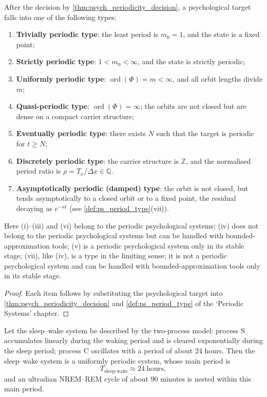 \begin{corollary}\label{cor:psych_period_type}
After the decision by \cref{thm:psych_periodicity_decision}, a psychological target falls into one of the following types:
\begin{enumerate}[label=(\roman*)]
    \item \textbf{Trivially periodic type}: the least period is $m_0=1$, and the state is a fixed point;
    \item \textbf{Strictly periodic type}: $1<m_0<\infty$, and the state is strictly periodic;
    \item \textbf{Uniformly periodic type}: $\operatorname{ord}(\Phi)=m<\infty$, and all orbit lengths divide $m$;
    \item \textbf{Quasi-periodic type}: $\operatorname{ord}(\Phi)=\infty$; the orbits are not closed but are dense on a compact carrier structure;
    \item \textbf{Eventually periodic type}: there exists $N$ such that the target is periodic for $t\ge N$;
    \item \textbf{Discretely periodic type}: the carrier structure is $\mathbb Z$, and the normalised period ratio is $\rho=T_x/\Delta x\in\mathbb Q$.
    \item \textbf{Asymptotically periodic (damped) type}: the orbit is not closed, but tends asymptotically to a closed orbit or to a fixed point, the residual decaying as $e^{-\kappa t}$ (see \cref{def:ps_period_type}(vii)).
\end{enumerate}
Here (i)--(iii) and (vi) belong to the periodic psychological systems; (iv) does not belong to the periodic psychological systems but can be handled with bounded-approximation tools; (v) is a periodic psychological system only in its stable stage; (vii), like (iv), is a type in the limiting sense; it is not a periodic psychological system and can be handled with bounded-approximation tools only in its stable stage.
\end{corollary}

\begin{proof}
Each item follows by substituting the psychological target into \cref{thm:psych_periodicity_decision} and \cref{def:ps_period_type} of the `Periodic Systems' chapter.
\end{proof}

\begin{lemma}\label{lem:sleep_periodic}
Let the sleep--wake system be described by the two-process model: process S accumulates linearly during the waking period and is cleared exponentially during the sleep period; process C oscillates with a period of about 24 hours. Then the sleep--wake system is a uniformly periodic system, whose main period is
\[
T_{\text{sleep-wake}}\approx 24\ \text{hours},
\]
and an ultradian NREM--REM cycle of about $90$ minutes is nested within this main period.
\end{lemma}

